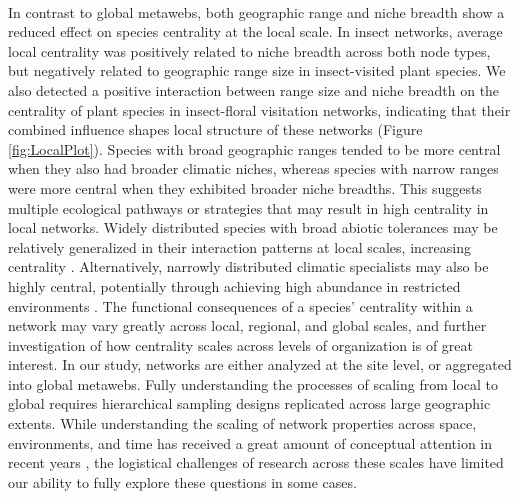 \paragraph*{}
In contrast to global metawebs, both geographic range and niche breadth show a reduced effect on species centrality at the local scale. In insect networks, average local centrality was positively related to niche breadth across both node types, but negatively related to geographic range size in insect-visited plant species. We also detected a positive interaction between range size and niche breadth on the centrality of plant species in insect-floral visitation networks, indicating that their combined influence shapes local structure of these networks (Figure \ref{fig:LocalPlot}). Species with broad geographic ranges tended to be more central when they also had broader climatic niches, whereas species with narrow ranges were more central when they exhibited broader niche breadths. This suggests multiple ecological pathways or strategies that may result in high centrality in local networks. Widely distributed species with broad abiotic tolerances may be relatively generalized in their interaction patterns at local scales, increasing centrality \parencite{hurtado2024generalism}. Alternatively, narrowly distributed climatic specialists may also be highly central, potentially through achieving high abundance in restricted environments \parencite{suarez2023dispersal}. The functional consequences of a species' centrality within a network may vary greatly across local, regional, and global scales, and further investigation of how centrality scales across levels of organization is of great interest. In our study, networks are either analyzed at the site level, or aggregated into global metawebs. Fully understanding the processes of scaling from local to global requires hierarchical sampling designs replicated across large geographic extents. While understanding the scaling of network properties across space, environments, and time has received a great amount of conceptual attention in recent years \parencite{tylianakis2008global,morales2008effect, burkle2011future,  moulatlet2023species}, the logistical challenges of research across these scales have limited our ability to fully explore these questions in some cases. 

